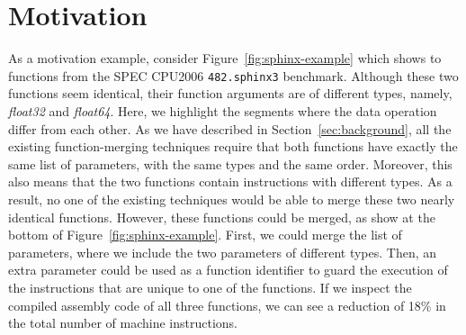 \section{Motivation} \label{sec:motivation}


As a motivation example, consider Figure~\ref{fig:sphinx-example} which shows to functions from the SPEC CPU2006 \texttt{482.sphinx3}
benchmark. Although these two functions seem identical, their function arguments are of different types, namely, \textit{float32} and
\textit{float64}. Here, we highlight the segments where the data operation differ from each other. As we have described in
Section~\ref{sec:background}, all the existing function-merging techniques require that both functions have exactly the same list of
parameters, with the same types and the same order. Moreover, this also means that the two functions contain instructions with different
types. As a result, no one of the existing techniques would be able to merge these two nearly identical functions.
However, these functions could be merged, as show at the bottom of Figure~\ref{fig:sphinx-example}.
First, we could merge the list of parameters, where we include the two parameters of different types.
Then, an extra parameter could be used as a function identifier to guard the execution of the instructions that
are unique to one of the functions.
If we inspect the compiled assembly code of all three functions, we can see a reduction of 18\% in the total number of machine instructions.

